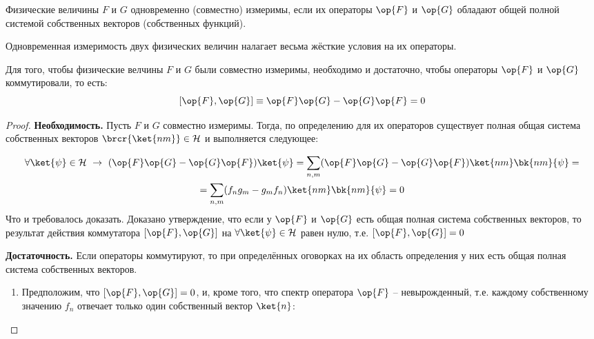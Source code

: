 \begin{defn}
Физические величины $F$ и $G$ одновременно (совместно) измеримы, если их операторы $\op{F}$ и $\op{G}$ обладают общей полной системой собственных векторов (собственных функций).
\end{defn}

Одновременная измеримость двух физических величин налагает весьма жёсткие условия на их операторы.

\begin{thm}\label{theorema_iv_chapter}
Для того, чтобы физические велчины $F$ и $G$ были совместно измеримы, необходимо и достаточно, чтобы операторы $\op{F}$ и $\op{G}$ коммутировали, то есть: 
$$[\op{F}, \op{G}] \equiv \op{F}\op{G} - \op{G}\op{F} = 0$$
\end{thm}

\begin{proof}

{\bf Необходимость.} Пусть $F$ и $G$ совместно измеримы. Тогда, по определению для их операторов существует полная общая система собственных векторов $\brcr{\ket{nm}} \in \mathcal{H}$ и выполняется следующее:

$$
\begin{gathered}
\forall \ket{\psi} \in \mathcal{H} ~\rightarrow ~
  (\op{F}\op{G} - \op{G}\op{F}) \ket{\psi} =
    \sum_{n,m} (\op{F}\op{G} - \op{G}\op{F}) \ket{nm}\bk{nm}{\psi} = \\ =
    \sum_{n,m} (f_n g_m - g_m f_n) \ket{nm}\bk{nm}{\psi} = 0
\end{gathered}
$$%
%
Что и требовалось доказать. Доказано утверждение, что если у $\op{F}$ и $\op{G}$ есть общая полная система собственных векторов, то результат действия коммутатора $[\op{F}, \op{G}]$ на $\forall \ket{\psi} \in \mathcal{H}$ равен нулю, т.е. $[\op{F}, \op{G}] = 0$

{\bf Достаточность.} Если операторы коммутируют, то при определённых оговорках на их область определения у них есть общая полная система собственных векторов.

\begin{enumerate}
\renewcommand\labelenumi{(\alph{enumi})}

\item Предположим, что $[\op{F}, \op{G}] = 0$, и, кроме того, что спектр оператора $\op{F}$ -- невырожденный, т.е. каждому собственному значению $f_n$ отвечает только один собственный вектор $\ket{n}$:


\end{enumerate}
\end{proof}
